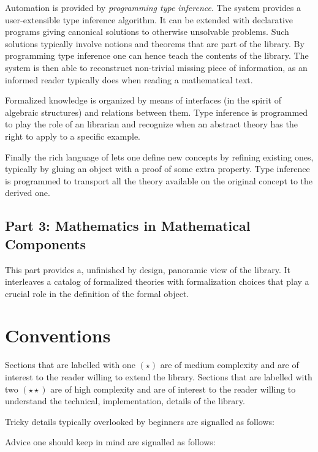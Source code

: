Automation is provided by \emph{programming type inference}.
The \Coq{} system provides a user-extensible type inference
algorithm.  It can be extended with declarative programs
giving canonical solutions to otherwise unsolvable problems.
Such solutions typically involve notions and theorems that
are part of the \mcbMC{} library.  By programming type inference
one can hence teach \Coq{} the contents of the library.  The system
is then able to reconstruct non-trivial missing piece of information,
as an informed reader typically does when reading a mathematical text.

Formalized knowledge is organized by means of interfaces (in the spirit of
algebraic structures) and relations between them.  Type inference is programmed
to play the role of an librarian and recognize when an abstract theory has the
right to apply to a specific example.

Finally the rich language of \Coq{} lets one define new concepts
by refining existing ones, typically by gluing an object with
a proof of some extra property.  Type inference is programmed
to transport all the theory available on
the original concept to the derived one.

\subsection{Part 3: Mathematics in Mathematical Components}

This part provides a, unfinished by design, panoramic view of the
\mcbMC{} library.  It interleaves a catalog of formalized theories with
formalization choices that play a crucial role in the
definition of the formal object.

\section{Conventions}

Sections that are labelled with one $(\star)$ are of medium complexity and are
of interest to the reader willing to extend the \mcbMC{} library.  Sections
that are labelled with two $(\star\star)$ are of high complexity and are of
interest to the reader willing to understand the technical, implementation,
details of the \mcbMC{} library.

Tricky details typically overlooked by beginners are signalled as follows:

Advice one should keep in mind are signalled as follows:

